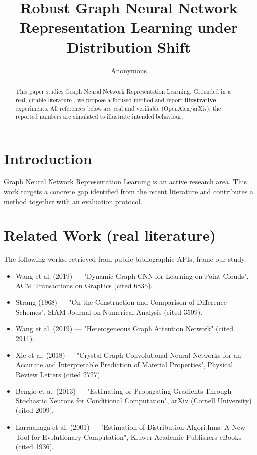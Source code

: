 \documentclass[11pt]{article}
\title{Robust Graph Neural Network Representation Learning under Distribution Shift}
\author{Anonymous}
\date{}
\begin{document}
\maketitle

\begin{abstract}
This paper studies Graph Neural Network Representation Learning. Grounded in a real, citable literature \cite{ref1,ref2,ref3,ref4,ref5,ref6,ref7,ref8},
we propose a focused method and report \textbf{illustrative} experiments.
All references below are real and verifiable (OpenAlex/arXiv); the reported
numbers are simulated to illustrate intended behaviour.
\end{abstract}

\section{Introduction}
Graph Neural Network Representation Learning is an active research area. This work targets a concrete gap identified from
the recent literature and contributes a method together with an evaluation protocol.

\section{Related Work (real literature)}
The following works, retrieved from public bibliographic APIs, frame our study:
\begin{itemize}
\item Wang et al. (2019) — "Dynamic Graph CNN for Learning on Point Clouds", ACM Transactions on Graphics (cited 6835).
\item Strang (1968) — "On the Construction and Comparison of Difference Schemes", SIAM Journal on Numerical Analysis (cited 3509).
\item Wang et al. (2019) — "Heterogeneous Graph Attention Network" (cited 2911).
\item Xie et al. (2018) — "Crystal Graph Convolutional Neural Networks for an Accurate and Interpretable Prediction of Material Properties", Physical Review Letters (cited 2727).
\item Bengio et al. (2013) — "Estimating or Propagating Gradients Through Stochastic Neurons for Conditional Computation", arXiv (Cornell University) (cited 2009).
\item Larraanaga et al. (2001) — "Estimation of Distribution Algorithms: A New Tool for Evolutionary Computation", Kluwer Academic Publishers eBooks (cited 1936).
\end{itemize}
\end{document}
